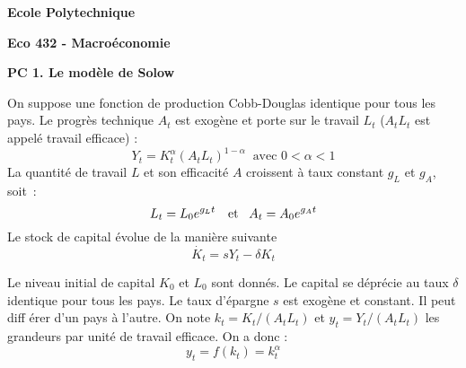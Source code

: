 \documentclass[11pt,a4paper]{article}
\begin{document}
\begin{center}
\textbf{Ecole Polytechnique}

\bigskip

\textbf{Eco 432 - Macro\'{e}conomie}

\bigskip

\textbf{PC 1. Le mod\`{e}le de Solow}

\hspace{1.0in}
\end{center}

\bigskip

\noindent On suppose une fonction de production Cobb-Douglas identique pour
tous les pays. Le progr\`{e}s technique $A_{t}$ est exog\`{e}ne et porte sur
le travail $L_{t}$ ($A_{t}L_{t}$ est appel\'{e} travail efficace) : 
\begin{equation*}
Y_{t}=K_{t}^{\alpha }(A_{t}L_{t})^{1-\alpha }\ \text{\ avec }0<\alpha <1
\end{equation*}%
La quantit\'{e} de travail $L$ et son efficacit\'{e} $A$ croissent \`{a}
taux constant $g_{L}$ et $g_{A}$, $\ $soit~: 
\begin{equation*}
L_{t}=L_{0}e^{g_{L}t}\text{ \ \ et \thinspace\ }A_{t}=A_{0}e^{g_{A}t}
\end{equation*}%
Le stock de capital \'{e}volue de la mani\`{e}re suivante
\begin{equation*}
\dot{K_t}=s Y_t-\delta K_t
\end{equation*}%


\noindent Le niveau initial de capital $K_0$ et $L_0$ sont donnés. Le capital se d\'{e}pr\'{e}cie au taux $\delta $ identique pour tous les
pays. Le taux d'\'{e}pargne $s$ est exog\`{e}ne et constant. Il peut diff%
\'{e}rer d'un pays \`{a} l'autre. On note $k_{t}=K_{t}/(A_{t}L_{t})$ et $%
y_{t}=Y_{t}/(A_{t}L_{t})$ les grandeurs par unit\'{e} de travail efficace.
On a donc : 
\begin{equation*}
y_{t}=f(k_{t})=k_{t}^{\alpha }
\end{equation*}
\end{document}
